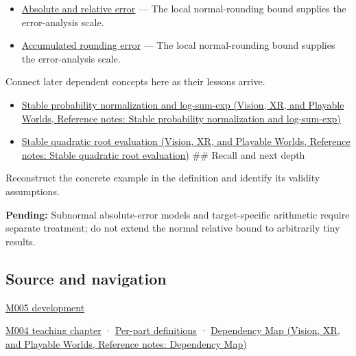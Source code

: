 \begin{itemize}
\tightlist
\item
  \hyperref[appendix-3ae74e89b4e6]{Absolute and relative error} --- The local normal-rounding bound supplies the error-analysis scale.
\item
  \hyperref[appendix-f82e270791c8]{Accumulated rounding error} --- The local normal-rounding bound supplies the error-analysis scale.
\end{itemize}

Connect later dependent concepts here as their lessons arrive.

\begin{itemize}
\tightlist
\item
  \href{../07-Vision-XR-and-Playable-Worlds/main.pdf\#nameddest=appendix-d580b422240f}{Stable probability normalization and log-sum-exp (Vision, XR, and Playable Worlds, Reference notes: Stable probability normalization and log-sum-exp)}
\item
  \href{../07-Vision-XR-and-Playable-Worlds/main.pdf\#nameddest=appendix-b9afba7f63e5}{Stable quadratic root evaluation (Vision, XR, and Playable Worlds, Reference notes: Stable quadratic root evaluation)} \#\# Recall and next depth
\end{itemize}

Reconstruct the concrete example in the definition and identify its validity assumptions.

\textbf{Pending:} Subnormal absolute-error models and target-specific arithmetic require separate treatment; do not extend the normal relative bound to arbitrarily tiny results.

\subsection{Source and navigation}\label{appendix-bc44f7b42f42-source-and-navigation}

\hyperref[01-foundations-i-ch001-when-arithmetic-meets-uncertainty]{M005 development}

\hyperref[01-foundations-i-ch001-a-stretching-ruler-for-real-valued-quantities]{M004 teaching chapter} · \hyperref[appendix-fd090d982a15-m004---parts-61-76]{Per-part definitions} · \href{../07-Vision-XR-and-Playable-Worlds/main.pdf\#nameddest=appendix-4ad47bdd269a}{Dependency Map (Vision, XR, and Playable Worlds, Reference notes: Dependency Map)}
